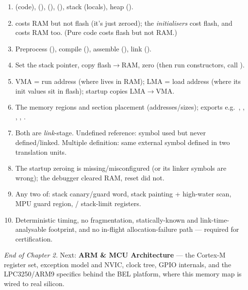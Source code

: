 \begin{answerkey}
\begin{enumerate}
\item {} (code),  (), 
  (),  (), stack (locals), heap
  ().
\item {} costs RAM but not flash (it's just zeroed); the 
  \emph{initialisers} cost flash, and  costs RAM too. (Pure code
  costs flash but not RAM.)
\item Preprocess (), compile (), assemble (),
  link ().
\item Set the stack pointer, copy  flash$\rightarrow$RAM, zero
   (then run constructors, call ).
\item VMA = run address (where  lives in RAM); LMA = load address
  (where its init values sit in flash); startup copies LMA$\rightarrow$VMA.
\item The memory regions and section placement (addresses/sizes); exports e.g.\
  , , , , .
\item Both are \emph{link}-stage. Undefined reference: symbol used but never
  defined/linked. Multiple definition: same external symbol defined in two
  translation units.
\item The startup  zeroing is missing/misconfigured (or its linker
  symbols are wrong); the debugger cleared RAM, reset did not.
\item Any two of: stack canary/guard word, stack painting + high-water scan,
  MPU guard region, \code{MSPLIM}/\code{PSPLIM} stack-limit registers.
\item Deterministic timing, no fragmentation, statically-known and
  link-time-analysable footprint, and no in-flight allocation-failure path ---
  required for certification.
\end{enumerate}
\end{answerkey}

\begin{partnote}
\emph{End of Chapter 2.} Next: \textbf{ARM \& MCU Architecture} --- the
Cortex-M register set, exception model and NVIC, clock tree, GPIO internals,
and the LPC3250/ARM9 specifics behind the BEL platform, where this memory map
is wired to real silicon.
\end{partnote}
